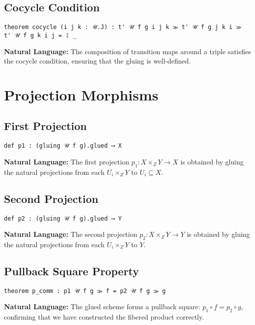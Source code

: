 \documentclass{article}
\theoremstyle{definition}
\begin{document}
\subsection{Cocycle Condition}

\begin{lstlisting}
theorem cocycle (i j k : 𝒰.J) : t' 𝒰 f g i j k ≫ t' 𝒰 f g j k i ≫ t' 𝒰 f g k i j = 𝟙 _
\end{lstlisting}

\textbf{Natural Language:} The composition of transition maps around a triple satisfies the cocycle condition, ensuring that the gluing is well-defined.

\section{Projection Morphisms}

\subsection{First Projection}

\begin{lstlisting}
def p1 : (gluing 𝒰 f g).glued ⟶ X
\end{lstlisting}

\textbf{Natural Language:} The first projection $p_1: X \times_Z Y \to X$ is obtained by gluing the natural projections from each $U_i \times_Z Y$ to $U_i \subseteq X$.

\subsection{Second Projection}

\begin{lstlisting}
def p2 : (gluing 𝒰 f g).glued ⟶ Y
\end{lstlisting}

\textbf{Natural Language:} The second projection $p_2: X \times_Z Y \to Y$ is obtained by gluing the natural projections from each $U_i \times_Z Y$ to $Y$.

\subsection{Pullback Square Property}

\begin{lstlisting}
theorem p_comm : p1 𝒰 f g ≫ f = p2 𝒰 f g ≫ g
\end{lstlisting}

\textbf{Natural Language:} The glued scheme forms a pullback square: $p_1 \circ f = p_2 \circ g$, confirming that we have constructed the fibered product correctly.
\end{document}
